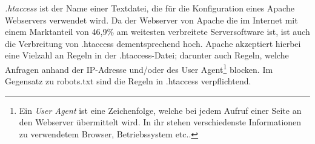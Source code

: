\emph{.htaccess} ist der Name einer Textdatei, die für die Konfiguration eines Apache Webservers verwendet wird. Da der Webserver von Apache die im Internet mit einem Marktanteil von 46,9\%\cite[Stand 24.03.2018:][]{statistik-webserver} am weitesten verbreitete Serversoftware ist, ist auch die Verbreitung von .htaccess dementsprechend hoch.
Apache akzeptiert hierbei eine Vielzahl an Regeln in der .htaccess-Datei; darunter auch Regeln, welche Anfragen anhand der IP-Adresse und/oder des User Agent\footnote{Ein \emph{User Agent} ist eine Zeichenfolge, welche bei jedem Aufruf einer Seite an den Webserver übermittelt wird. In ihr stehen verschiedenste Informationen zu verwendetem Browser, Betriebssystem etc.\cite{user-agent-info}.} blocken. Im Gegensatz zu robots.txt sind die Regeln in .htaccess verpflichtend.